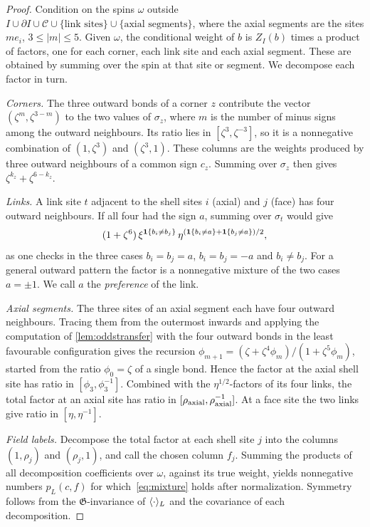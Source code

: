 \begin{proof}
Condition on the spins $\omega$ outside $I\cup\partial I\cup\mathcal C\cup\{\text{link sites}\}\cup\{\text{axial segments}\}$, where the axial segments are the sites $me_i$, $3\le|m|\le5$. Given $\omega$, the conditional weight of $b$ is $Z_I(b)$ times a product of factors, one for each corner, each link site and each axial segment. These are obtained by summing over the spin at that site or segment. We decompose each factor in turn.

\emph{Corners.} The three outward bonds of a corner $z$ contribute the vector $(\zeta^m,\zeta^{3-m})$ to the two values of $\sigma_z$, where $m$ is the number of minus signs among the outward neighbours. Its ratio lies in $[\zeta^3,\zeta^{-3}]$, so it is a nonnegative combination of $(1,\zeta^3)$ and $(\zeta^3,1)$. These columns are the weights produced by three outward neighbours of a common sign $c_z$. Summing over $\sigma_z$ then gives $\zeta^{k_z}+\zeta^{6-k_z}$.

\emph{Links.} A link site $t$ adjacent to the shell sites $i$ (axial) and $j$ (face) has four outward neighbours. If all four had the sign $a$, summing over $\sigma_t$ would give
\[
 (1+\zeta^6)\,\xi^{\mathbf 1\{b_i\ne b_j\}}\,\eta^{(\mathbf 1\{b_i\ne a\}+\mathbf 1\{b_j\ne a\})/2},
\]
as one checks in the three cases $b_i=b_j=a$, $b_i=b_j=-a$ and $b_i\ne b_j$. For a general outward pattern the factor is a nonnegative mixture of the two cases $a=\pm1$. We call $a$ the \emph{preference} of the link.

\emph{Axial segments.} The three sites of an axial segment each have four outward neighbours. Tracing them from the outermost inwards and applying the computation of \cref{lem:oddstransfer} with the four outward bonds in the least favourable configuration gives the recursion $\phi_{m+1}=(\zeta+\zeta^4\phi_m)/(1+\zeta^5\phi_m)$, started from the ratio $\phi_0=\zeta$ of a single bond. Hence the factor at the axial shell site has ratio in $[\phi_3,\phi_3^{-1}]$. Combined with the $\eta^{1/2}$-factors of its four links, the total factor at an axial site has ratio in $[\rho_{\rm axial},\rho_{\rm axial}^{-1}]$. At a face site the two links give ratio in $[\eta,\eta^{-1}]$.

\emph{Field labels.} Decompose the total factor at each shell site $j$ into the columns $(1,\rho_j)$ and $(\rho_j,1)$, and call the chosen column $f_j$. Summing the products of all decomposition coefficients over $\omega$, against its true weight, yields nonnegative numbers $p_L(c,f)$ for which~\eqref{eq:mixture} holds after normalization. Symmetry follows from the $\mathfrak G$-invariance of $\langle \cdot\rangle_L$ and the covariance of each decomposition.
\end{proof}

